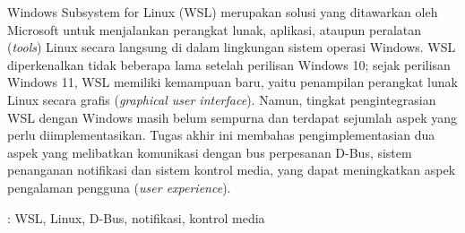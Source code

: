 Windows Subsystem for Linux (WSL) merupakan solusi yang ditawarkan oleh Microsoft untuk menjalankan perangkat lunak, aplikasi, ataupun peralatan (\textit{tools}) Linux secara langsung di dalam lingkungan sistem operasi Windows. WSL diperkenalkan tidak beberapa lama setelah perilisan Windows 10; sejak perilisan Windows 11, WSL memiliki kemampuan baru, yaitu penampilan perangkat lunak Linux secara grafis (\textit{graphical user interface}). Namun, tingkat pengintegrasian WSL dengan Windows masih belum sempurna dan terdapat sejumlah aspek yang perlu diimplementasikan. Tugas akhir ini membahas pengimplementasian dua aspek yang melibatkan komunikasi dengan bus perpesanan D-Bus, sistem penanganan notifikasi dan sistem kontrol media, yang dapat meningkatkan aspek pengalaman pengguna (\textit{user experience}).

 : WSL, Linux, D-Bus, notifikasi, kontrol media

